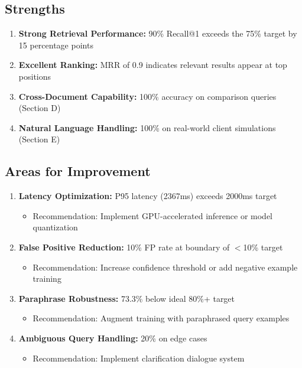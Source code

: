 \documentclass[11pt,a4paper]{article}
\begin{document}
\subsection{Strengths}

\begin{enumerate}
    \item \textbf{Strong Retrieval Performance:} 90\% Recall@1 exceeds the 75\% target by 15 percentage points
    \item \textbf{Excellent Ranking:} MRR of 0.9 indicates relevant results appear at top positions
    \item \textbf{Cross-Document Capability:} 100\% accuracy on comparison queries (Section D)
    \item \textbf{Natural Language Handling:} 100\% on real-world client simulations (Section E)
\end{enumerate}

\subsection{Areas for Improvement}

\begin{enumerate}
    \item \textbf{Latency Optimization:} P95 latency (2367ms) exceeds 2000ms target
    \begin{itemize}
        \item Recommendation: Implement GPU-accelerated inference or model quantization
    \end{itemize}
    
    \item \textbf{False Positive Reduction:} 10\% FP rate at boundary of $<$10\% target
    \begin{itemize}
        \item Recommendation: Increase confidence threshold or add negative example training
    \end{itemize}
    
    \item \textbf{Paraphrase Robustness:} 73.3\% below ideal 80\%+ target
    \begin{itemize}
        \item Recommendation: Augment training with paraphrased query examples
    \end{itemize}
    
    \item \textbf{Ambiguous Query Handling:} 20\% on edge cases
    \begin{itemize}
        \item Recommendation: Implement clarification dialogue system
    \end{itemize}
\end{enumerate}
\end{document}
